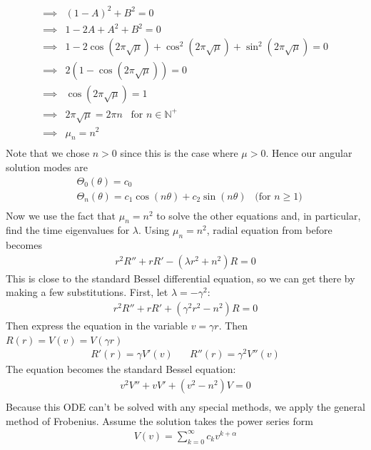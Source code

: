 \documentclass[12pt]{article}
\begin{document}
\begin{enumerate}[(a)]
{$$$$
\begin{align*}
\implies& (1-A)^2 + B^2 = 0 \\
\implies& 1 - 2A + A^2 + B^2 = 0 \\
\implies& 1 - 2 \cos(2\pi \sqrt{\mu}) + \cos^2(2\pi \sqrt{\mu})  + \sin^2( 2\pi \sqrt{\mu})= 0 \\
\implies& 2(1 - \cos(2\pi \sqrt{\mu})) = 0 \\
\implies& \cos(2\pi \sqrt{\mu}) = 1 \\
\implies& 2\pi \sqrt{\mu} = 2\pi n \;\;\; \text{for $n \in \mathbb{N}^+$}  \\
\implies& \mu_n = n^2 \\
\end{align*}
Note that we chose $n > 0$ since this is the case where $\mu > 0$. Hence our angular solution modes are
\begin{align*}
& \Theta_0(\theta) = c_0 \\
& \Theta_n(\theta) = c_1 \cos \left( n \theta \right) + c_2 \sin \left(n \theta \right) \;\;\; \text{(for $n \geq 1$)} \\
\end{align*}
Now we use the fact that $\mu_n = n^2$ to solve the other equations and, in particular, find the time eigenvalues for $\lambda$. Using $\mu_n = n^2$, radial equation from before becomes
\begin{align*}
r^2 R'' + rR' -  (\lambda r^2 + n^2) R = 0
\end{align*}
This is close to the standard Bessel differential equation, so we can get there by making a few substitutions. First, let $\lambda = -\gamma^2$:
\begin{align*}
r^2 R'' + rR' + (\gamma^2 r^2 - n^2) R = 0
\end{align*}
Then express the equation in the variable $v = \gamma r$. Then $R(r) = V(v) = V(\gamma r)$
\begin{align*}
R'(r) = \gamma V'(v) \;\;\;\;\;\; R''(r) = \gamma^2 V''(v)
\end{align*}
The equation becomes the standard Bessel equation: \\
\begin{align*}
v^2 V'' + vV' + (v^2 - n^2) V = 0 \\
\end{align*}
Because this ODE can't be solved with any special methods, we apply the general method of Frobenius. Assume the solution takes the power series form
\begin{align*}
V(v) = \sum_{k=0}^{\infty} c_k v^{k + \alpha}

\end{align*}}
\end{enumerate}
\end{document}
